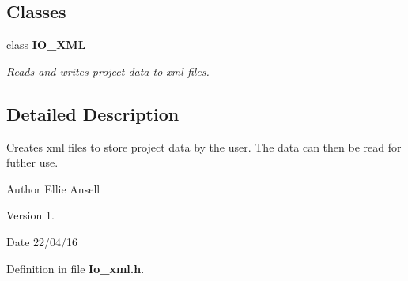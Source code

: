 \subsection*{Classes}
\begin{DoxyCompactItemize}
\item 
class {\bf I\-O\-\_\-\-X\-M\-L}
\begin{DoxyCompactList}\small\item\em Reads and writes project data to xml files. \end{DoxyCompactList}\end{DoxyCompactItemize}


\subsection{Detailed Description}
Creates xml files to store project data by the user. The data can then be read for futher use. \begin{DoxyAuthor}{Author}
Ellie Ansell 
\end{DoxyAuthor}
\begin{DoxyVersion}{Version}
1. 
\end{DoxyVersion}
\begin{DoxyDate}{Date}
22/04/16 
\end{DoxyDate}


Definition in file {\bf Io\-\_\-xml.\-h}.

